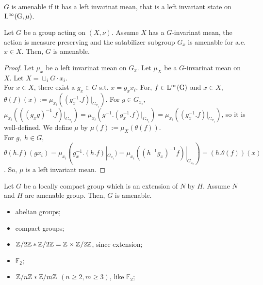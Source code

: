 \begin{definition}
  $G$ is amenable if it has a left invarinat mean, that is a left invariant state on $\rm{L}^{\infty}(G,\mu)$.
\end{definition}

\begin{proposition}
  Let $G$ be a group acting on $(X, \nu)$.
  Assume $X$ has a $G$-invarinat mean,
  the action is measure preserving and 
  the satabilizer subgroup $G_x$ is amenable for a.e. $x \in X$.
  Then, $G$ is amenable.
\end{proposition}

\begin{proof}
  Let $\mu_x$ be a left invarinat mean on $G_x$.
  Let $\mu_X$ be a $G$-invarinat mean on $X$.
  Let $X = \sqcup_i G\cdot x_i$.\\
  For $x \in X$, there exist a $g_x \in G$ s.t. $x = g_x x_i$.
  For, $f \in \rm{L}^\infty(G)$ and $x \in X$, 
  $\theta(f)(x) := \mu_{x_i}((g_x^{-1}. f)|_{G_{x_i}})$.
  For $g \in G_{x_i}$, $\mu_{x_i}(((g_x g)^{-1}. f)|_{G_{x_i}}) = \mu_{x_i}(g^{-1}.(g_x^{-1}.f)|_{G_{x_i}}) = \mu_{x_i}((g_x^{-1}. f)|_{G_{x_i}})$,
  so it is well-defined.
  We define $\mu$ by $\mu(f) := \mu_X(\theta(f))$.\\ 
  For $g,\; h \in G$, $\theta(h.f)(g x_i) = \mu_{x_i}(g_x^{-1}.(h.f)|_{G_{x_i}}) = \mu_{x_i}((h^{-1}g_x)^{-1}f)|_{G_{x_i}}) = (h.\theta(f))(x)$.
  So, $\mu$ is a left invariant mean. 
\end{proof}

\begin{corollary}
  Let $G$ be a locally compact group which is an extension of $N$ by $H$.
  Assume $N$ and $H$ are amenable group.
  Then, $G$ is amenable.
\end{corollary}

\begin{example}[amenale]
  \begin{itemize}
    \item abelian groups;
    \item compact groups;
    \item $\mathbb{Z}/2\mathbb{Z} * \mathbb{Z}/2\mathbb{Z} = \mathbb{Z} \rtimes \mathbb{Z}/2\mathbb{Z}$, since extension;
  \end{itemize}
\end{example}

\begin{example}
  \begin{itemize}
    \item $\mathbb{F}_2$;
    \item $\mathbb{Z}/n\mathbb{Z} * \mathbb{Z}/m\mathbb{Z}$ $(n \geq 2, m \geq 3)$, like $\mathbb{F}_2$;
  \end{itemize}
\end{example}

